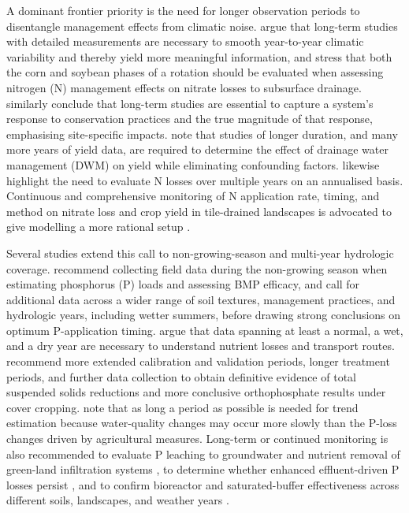A dominant frontier priority is the need for longer observation periods to disentangle management effects from climatic noise. \textcite{Randall2003,Randall2005} argue that long-term studies with detailed measurements are necessary to smooth year-to-year climatic variability and thereby yield more meaningful information, and stress that both the corn and soybean phases of a rotation should be evaluated when assessing nitrogen (N) management effects on nitrate losses to subsurface drainage. \textcite{Waring2024} similarly conclude that long-term studies are essential to capture a system's response to conservation practices and the true magnitude of that response, emphasising site-specific impacts. \textcite{Cooke2012} note that studies of longer duration, and many more years of yield data, are required to determine the effect of drainage water management (DWM) on yield while eliminating confounding factors. \textcite{Pittelkow2017} likewise highlight the need to evaluate N losses over multiple years on an annualised basis. Continuous and comprehensive monitoring of N application rate, timing, and method on nitrate loss and crop yield in tile-drained landscapes is advocated to give modelling a more rational setup \parencite{Jeong2018}.

Several studies extend this call to non-growing-season and multi-year hydrologic coverage. \textcite{VanEsbroeck2016} recommend collecting field data during the non-growing season when estimating phosphorus (P) loads and assessing BMP efficacy, and call for additional data across a wider range of soil textures, management practices, and hydrologic years, including wetter summers, before drawing strong conclusions on optimum P-application timing. \textcite{vanderSalm2012} argue that data spanning at least a normal, a wet, and a dry year are necessary to understand nutrient losses and transport routes. \textcite{SalcedaGonzalez2025} recommend more extended calibration and validation periods, longer treatment periods, and further data collection to obtain definitive evidence of total suspended solids reductions and more conclusive orthophosphate results under cover cropping. \textcite{Ulén2007} note that as long a period as possible is needed for trend estimation because water-quality changes may occur more slowly than the P-loss changes driven by agricultural measures. Long-term or continued monitoring is also recommended to evaluate P leaching to groundwater and nutrient removal of green-land infiltration systems \parencite{Duan2015}, to determine whether enhanced effluent-driven P losses persist \parencite{Monaghan2004}, and to confirm bioreactor and saturated-buffer effectiveness across different soils, landscapes, and weather years \parencite{Jaynes2019}.

